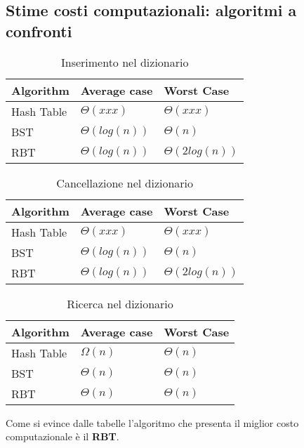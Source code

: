 \documentclass[paper=a4, fontsize=11pt,twoside]{scrartcl}   %
\begin{document}
			\subsection{Stime costi computazionali: algoritmi a confronti}				
				\begin{table}[ht]	
					\centering									
					\begin{tabular}{l | l | l}
						
						Algorithm & Average case & Worst Case \\
						\hline
						Hash Table & $\Theta(xxx)$ & $\Theta(xxx)$ \\
						\hline
						BST & $\Theta(log(n))$ & $\Theta(n)$ \\
						\hline
						RBT & $\Theta(log(n))$ & $\Theta(2log(n))$ \\
						\hline					
					\end{tabular}
					\caption{Inserimento nel dizionario} %
				\end{table}	
							
				\begin{table}[ht]
					\centering									
					\begin{tabular}{l | l | l}
						
						Algorithm & Average case & Worst Case \\
						\hline
						Hash Table & $\Theta(xxx)$ & $\Theta(xxx)$ \\
						\hline
						BST & $\Theta(log(n))$ & $\Theta(n)$ \\
						\hline
						RBT & $\Theta(log(n))$ & $\Theta(2log(n))$ \\
						\hline					
					\end{tabular}
					\caption{Cancellazione nel dizionario} %
				\end{table}
						
				\begin{table}[ht]
					\centering									
					\begin{tabular}{l | l | l}
						
						Algorithm & Average case & Worst Case \\
						\hline
						Hash Table & $\Omega(n)$ & $\Theta(n)$ \\
						\hline
						BST & $\Theta(n)$ & $\Theta(n)$ \\
						\hline
						RBT & $\Theta(n)$ & $\Theta(n)$ \\
						\hline					
					\end{tabular}
					\caption{Ricerca nel dizionario} %
				\end{table}
			 Come si evince dalle tabelle l'algoritmo che presenta il miglior costo computazionale è il \textbf{RBT}.
			 \pagebreak
			 
\end{document}
